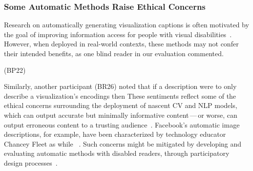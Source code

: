 \subsubsection{Some Automatic Methods Raise Ethical Concerns}
\label{section:qualResultsE}
Research on automatically generating visualization captions is often motivated by the goal of improving information access for people with visual disabilities~\cite{qian_generating_2021, demir_summarizing_2012, obeid_chart--text_2020, qian_formative_2020}.
However, when deployed in real-world contexts, these methods may not confer their intended benefits, as one blind reader in our evaluation commented.
\begin{displayquote}
    \vspace{-1mm}
     (BP22)
    \vspace{-1mm}
\end{displayquote}
Similarly, another participant (BR26) noted that if a description were to only describe a visualization's encodings then 
These sentiments reflect some of the ethical concerns surrounding the deployment of nascent \ac{CV} and \ac{NLP} models, which can output accurate but minimally informative content\,---\,or worse, can output erroneous content to a trusting audience~\cite{macleod_understanding_2017, obeid_chart--text_2020}.
Facebook's automatic image descriptions, for example, have been characterized by technology educator Chancey Fleet as  while ~\cite{fleet_things_2021, hanley_computer_2021}. Such concerns might be mitigated by developing and evaluating automatic methods with disabled readers, through participatory design processes~\cite{lundgard_sociotechnical_2019}.

